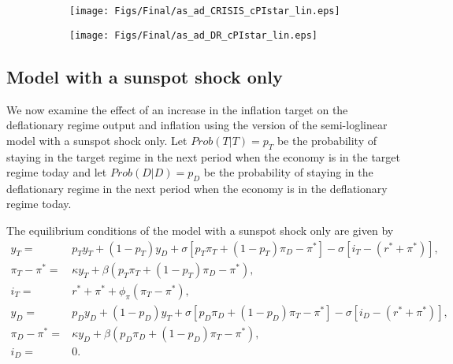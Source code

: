 \documentclass[11pt]{article}
\begin{document}
\begin{singlespace}
		\begin{figure}[h]
			\caption{AD and AS Curves in the Crisis State and in the Deflationary Regime\\---Semi-Loglinear Model---} \label{fig:ASAD_semi}
	        \vspace{-1em}
			\begin{center}
				\begin{subfigure}[b]{0.4\textwidth}
					\centering
					\texttt{[image: Figs/Final/as\_ad\_CRISIS\_cPIstar\_lin.eps]}
				\end{subfigure}
				\hspace{0.5cm}     
				\begin{subfigure}[b]{0.42\textwidth}
					\centering
					\texttt{[image: Figs/Final/as\_ad\_DR\_cPIstar\_lin.eps]}
				\end{subfigure}
			\end{center}
		\end{figure}
		
		\subsection{Model with a sunspot shock only}
		
		We now examine the effect of an increase in the inflation target on the deflationary regime output and inflation using the version of the semi-loglinear model with a sunspot shock only. Let $Prob(T|T) = p_T$ be the probability of staying in the target regime in the next period when the economy is in the target regime today and let $Prob(D|D) = p_D$ be the probability of staying in the deflationary regime in the next period when the economy is in the deflationary regime today.
		
		\noindent The equilibrium conditions of the model with a sunspot shock only are given by
		\begin{align}
			y_{T} =& p_T y_T + (1-p_T)y_D +  \sigma\left[p_T \pi_T + (1-p_T)\pi_D - \pi^* \right] - \sigma\left[i_T - (r^* + \pi^*)\right],\label{ee_edlt}\\
			\pi_{T} - \pi^* =& \kappa y_T + \beta\left(p_T \pi_T + (1-p_T)\pi_D - \pi^*\right),\\
			i_T =& r^* + \pi^* + \phi_{\pi}(\pi_T - \pi^*),\\
			y_{D} =& p_D y_D + (1-p_D)y_T +  \sigma\left[p_D \pi_D + (1-p_D)\pi_T - \pi^*\right] - \sigma\left[i_D - (r^* + \pi^*)\right],\\
			\pi_{D} - \pi^* =& \kappa y_D + \beta\left(p_D \pi_D + (1-p_D)\pi_T - \pi^*\right),\\
			i_D =& 0. \label{i_edlt}
		\end{align}
		

\end{singlespace}
\end{document}
